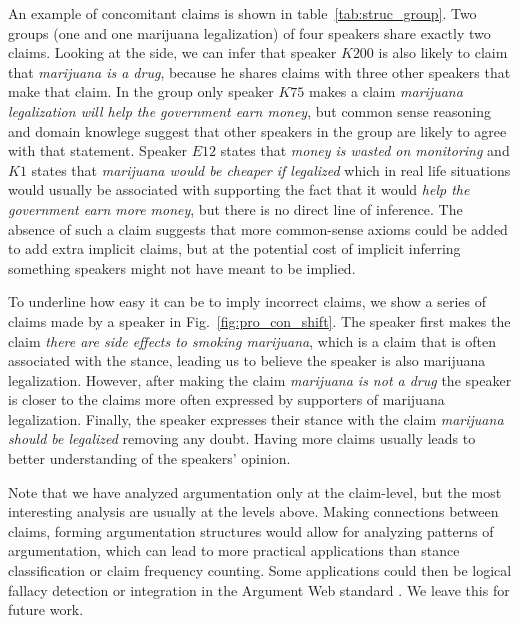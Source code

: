 An example of concomitant claims is shown in table~\ref{tab:struc_group}. 
Two groups (one  and one  marijuana legalization)
of four speakers share exactly two claims. Looking at the  side, we
can infer that speaker $K200$ is also likely to claim that \emph{marijuana is a drug}, because
he shares claims with three other speakers that make that claim.
In the  group only speaker $K75$ makes a claim 
\emph{marijuana legalization will help the government earn money}, but
common sense reasoning and domain knowlege suggest that other speakers in the group
are likely to agree with that statement. Speaker $E12$ states 
that \emph{money is wasted on monitoring} and $K1$ states that \emph{
marijuana would be cheaper if legalized} which in real life situations 
would usually be associated with supporting the fact that it would
\emph{help the government earn more money}, but there is no direct line of inference.
The absence of such a claim suggests that more common-sense axioms could be
added to add extra implicit claims, but at the potential cost of 
implicit inferring something speakers might not have meant to be implied. 

To underline how easy it can be to imply incorrect claims, we show a series of
claims made by a speaker in Fig.~\ref{fig:pro_con_shift}.  The speaker first
makes the claim \emph{there are side effects to smoking marijuana}, which is a
claim that is often associated with the  stance, leading us to believe
the speaker is also  marijuana legalization.  However, after
making the claim \emph{marijuana is not a drug} the speaker is closer to the
claims more often expressed by supporters of marijuana legalization.  Finally,
the speaker expresses their  stance with the claim \emph{marijuana
should be legalized} removing any doubt. Having more claims usually leads to
better understanding of the speakers' opinion. 

Note that we have analyzed argumentation only at the 
claim-level, but the most interesting analysis are usually at the levels above. 
Making connections between claims, forming argumentation structures would allow
for analyzing patterns of argumentation, which can lead to 
more practical applications
than stance classification or claim frequency counting. 
Some applications could then 
be logical fallacy detection or integration in the Argument Web standard
\citep{rahwan2007laying}. We leave this for future work.


